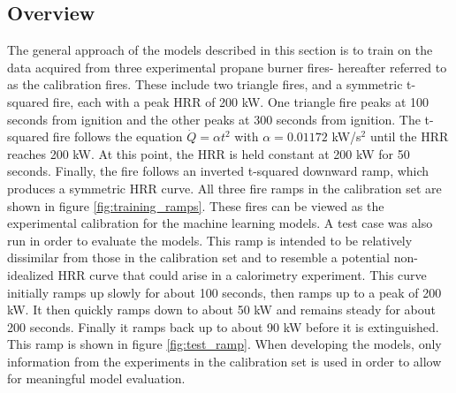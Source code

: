 \documentclass{article}
\begin{document}
\subsection{Overview}

The general approach of the models described in this section is to train on the data acquired from three experimental propane burner fires- hereafter referred to as the calibration fires. These include two triangle fires, and a symmetric t-squared fire, each with a peak HRR of 200 kW. One triangle fire peaks at 100 seconds from ignition and the other peaks at 300 seconds from ignition. The t-squared fire follows the equation $\dot{Q} = \alpha t^2$ with $\alpha=0.01172$ kW/s$^2$ until the HRR reaches 200 kW. At this point, the HRR is held constant at 200 kW for 50 seconds. Finally, the fire follows an inverted t-squared downward ramp, which produces a symmetric HRR curve. All three fire ramps in the calibration set are shown in figure \ref{fig:training_ramps}. These fires can be viewed as the experimental calibration for the machine learning models. A test case was also run in order to evaluate the models. This ramp is intended to be relatively dissimilar from those in the calibration set and to resemble a potential non-idealized HRR curve that could arise in a calorimetry experiment. This curve initially ramps up slowly for about 100 seconds, then ramps up to a peak of 200 kW. It then quickly ramps down to about 50 kW and remains steady for about 200 seconds. Finally it ramps back up to about 90 kW before it is extinguished. This ramp is shown in figure \ref{fig:test_ramp}. When developing the models, only information from the experiments in the calibration set is used in order to allow for meaningful model evaluation.
\end{document}
